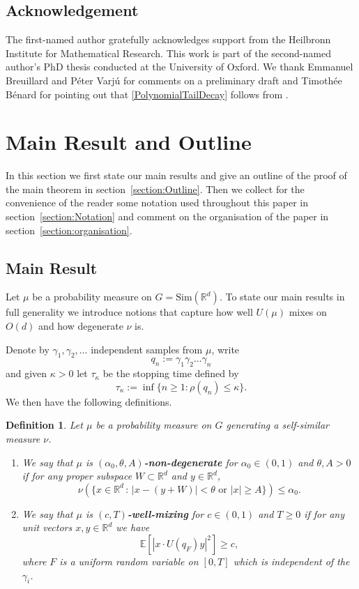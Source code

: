 \documentclass[10pt, english,oneside,reqno]{amsart}
\theoremstyle{plain}
\newtheorem{definition}[theorem]{Definition}
\theoremstyle{remark}
\numberwithin{equation}{section}
\numberwithin{figure}{section}
\newcommand{\R}{\mathbb{R}}
\begin{document}
    \subsection*{Acknowledgement} The first-named author gratefully acknowledges support from the Heilbronn Institute for Mathematical Research. This work is part of the second-named author's PhD thesis conducted at the University of Oxford. We  thank Emmanuel Breuillard and Péter Varjú for comments on a preliminary draft and Timothée Bénard for pointing out that \eqref{PolynomialTailDecay} follows from \cite{GuivarchLePage2016}. 

    \section{Main Result and Outline}
    \label{OutlineNotation}


In this section we first state our main results and give an outline of the proof of the main theorem in section~\ref{section:Outline}. Then we collect for the convenience of the reader some notation used throughout this paper in section~\ref{section:Notation} and comment on the organisation of the paper in section~\ref{section:organisation}.


\subsection{Main Result} \label{subsection:MainResult}

Let $\mu$ be a probability measure on $G = \mathrm{Sim}(\R^d)$. To state our main results in full generality we introduce notions that capture how well $U(\mu)$ mixes on $O(d)$ and how degenerate $\nu$ is. 

Denote by $\gamma_1, \gamma_2, \dots$ independent samples from $\mu$, write $$q_n := \gamma_1 \gamma_2 \dots \gamma_n$$ and given $\kappa > 0$ let $\tau_{\kappa}$ be the stopping time defined by $$\tau_{\kappa} := \inf \{ n \geq 1 : \rho(q_{n}) \leq \kappa \}.$$ We then have the following definitions.
    \begin{definition}
        Let $\mu$ be a probability measure on $G$ generating a self-similar measure $\nu$. \begin{enumerate}[label = (\roman*)]
            \item We say that $\mu$ is \textbf{$(\alpha_0,\theta,A)$-non-degenerate} for $\alpha_0 \in (0,1)$ and $\theta,A > 0$ if for any proper subspace $W \subset \R^d$ and $y\in \R^d$, $$\nu(\{ x \in \R^d \,:\, |x - (y + W)| < \theta \text{ or } |x| \geq A \}) \leq \alpha_0.$$ 
            \item We say that $\mu$ is \textbf{$(c,T)$-well-mixing} for $c \in (0,1)$ and $T \geq 0$ if for any unit vectors $x, y \in \R^d$ we have $$\mathbb{E}[|x \cdot U(q_{F})y|^2] \geq c,$$ %
            where $F$ is a uniform random variable on $[0, T]$ which is independent of the $\gamma_i$.
        \end{enumerate}
    \end{definition}
\end{document}
